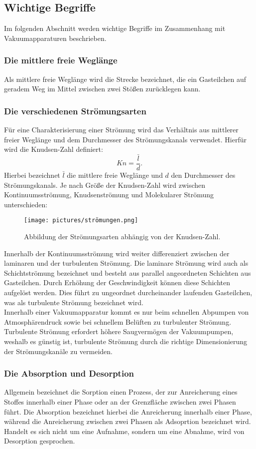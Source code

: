 \subsection{Wichtige Begriffe}
Im folgenden Abschnitt werden wichtige Begriffe im Zusammenhang mit Vakuumapparaturen
beschrieben.

\subsubsection*{Die mittlere freie Weglänge}
Als mittlere freie Weglänge wird die Strecke bezeichnet, die ein Gasteilchen
auf geradem Weg im Mittel zwischen zwei Stößen zurücklegen kann.

\subsubsection*{Die verschiedenen Strömungsarten}
Für eine Charakterisierung einer Strömung wird das Verhältnis aus mittlerer
freier Weglänge und dem Durchmesser des Strömungskanals verwendet. Hierfür wird die
Knudsen-Zahl definiert:
\begin{equation}
 Kn = \frac{\bar{l}}{d}.
\end{equation}
Hierbei bezeichnet $\bar{l}$ die mittlere freie Weglänge und $d$ den Durchmesser
des Strömungskanals. Je nach Größe der Knudsen-Zahl wird zwischen Kontinuumsströmung,
Knudsenströmung und Molekularer Strömung unterschieden:
\begin{figure}[H]
  \centering
  \texttt{[image: pictures/strömungen.png]}
  \label{fig:strömung}
  \caption{Abbildung der Strömungsarten abhängig von der Knudsen-Zahl.}
\end{figure}
\noindent
Innerhalb der Kontinuumsströmung wird weiter differenziert zwischen der laminaren
und der turbulenten Strömung. Die laminare Strömung wird auch als Schichtströmung
bezeichnet und besteht aus parallel angeordneten Schichten aus Gasteilchen. Durch
Erhöhung der Geschwindigkeit können diese Schichten aufgelöst werden. Dies führt
zu ungeordnet durcheinander laufenden Gasteilchen, was als turbulente Strömung
bezeichnet wird.\\
Innerhalb einer Vakuumapparatur kommt es nur beim schnellen Abpumpen von Atmosphärendruck
sowie bei schnellem Belüften zu turbulenter Strömung. Turbulente Strömung erfordert
höhere Saugvermögen der Vakuumpumpen, weshalb es günstig ist, turbulente Strömung durch
die richtige Dimensionierung der Strömungskanäle zu vermeiden.

\subsubsection*{Die Absorption und Desorption}
Allgemein bezeichnet die Sorption einen Prozess, der zur Anreicherung eines Stoffes
innerhalb einer Phase oder an der Grenzfläche zwischen zwei Phasen führt.
Die Absorption bezeichnet hierbei die Anreicherung innerhalb einer Phase, während die
Anreicherung zwischen zwei Phasen als Adsoprtion bezeichnet wird. Handelt es sich nicht
um eine Aufnahme, sondern um eine Abnahme, wird von Desorption gesprochen.


